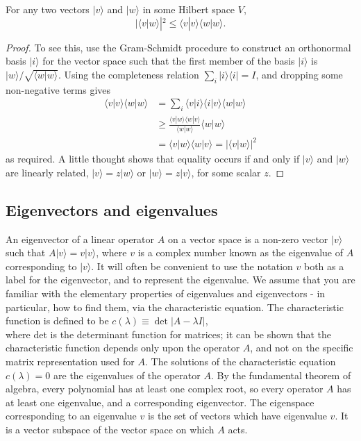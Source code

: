 \documentclass[
	11pt, %
	fleqn, %
	a4paper, %
]{LegrandOrangeBook}
\begin{document}
\begin{theorem}
    For any two vectors $|v\rangle$ and $|w\rangle$ in some Hilbert space $V$,
$$
|\langle v | w\rangle|^{2} \leq\langle v | v\rangle\langle w | w\rangle.
$$
\end{theorem}
\begin{proof}
    To see this, use the Gram-Schmidt procedure to construct an orthonormal basis $|i\rangle$ for the vector space such that the first member of the basis $|i\rangle$ is $|w\rangle / \sqrt{\langle w | w\rangle}$. Using the completeness relation $\sum_{i}|i\rangle\langle i|=I$, and dropping some non-negative terms gives
$$
\begin{aligned}
\langle v | v\rangle\langle w | w\rangle & =\sum_{i}\langle v | i\rangle\langle i | v\rangle\langle w | w\rangle \\
& \geq \frac{\langle v | w\rangle\langle w | v\rangle}{\langle w | w\rangle}\langle w | w\rangle \\
& =\langle v | w\rangle\langle w | v\rangle=|\langle v | w\rangle|^{2}
\end{aligned}
$$
as required. A little thought shows that equality occurs if and only if $|v\rangle$ and $|w\rangle$ are linearly related, $|v\rangle=z|w\rangle$ or $|w\rangle=z|v\rangle$, for some scalar $z$.
\end{proof}


\subsection{Eigenvectors and eigenvalues}

An eigenvector of a linear operator $A$ on a vector space is a non-zero vector $|v\rangle$ such that $A|v\rangle=v|v\rangle$, where $v$ is a complex number known as the eigenvalue of $A$ corresponding to $|v\rangle$. It will often be convenient to use the notation $v$ both as a label for the eigenvector, and to represent the eigenvalue. We assume that you are familiar with the elementary properties of eigenvalues and eigenvectors - in particular, how to find them, via the characteristic equation. The characteristic function is defined to be $c(\lambda) \equiv \operatorname{det}|A-\lambda I|$,\\
where det is the determinant function for matrices; it can be shown that the characteristic function depends only upon the operator $A$, and not on the specific matrix representation used for $A$. The solutions of the characteristic equation $c(\lambda)=0$ are the eigenvalues of the operator $A$. By the fundamental theorem of algebra, every polynomial has at least one complex root, so every operator $A$ has at least one eigenvalue, and a corresponding eigenvector. The eigenspace corresponding to an eigenvalue $v$ is the set of vectors which have eigenvalue $v$. It is a vector subspace of the vector space on which $A$ acts.
\end{document}

